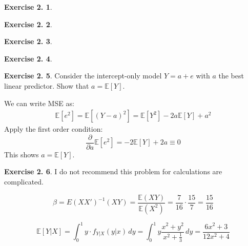 \documentclass[12pt,letterpaper,reqno]{amsart}
\newcommand{\E}{\mathbb E}
\theoremstyle{plain}
\theoremstyle{definition}
\theoremstyle{definition}
\newtheorem{Exercise}{Exercise 2.}
\numberwithin{equation}{section}
\begin{document}
\begin{Exercise}
\end{Exercise}

\begin{Exercise}
\end{Exercise}

\begin{Exercise}
\end{Exercise}

\begin{Exercise}
\end{Exercise}


\begin{Exercise} Consider the intercept-only model $Y = a + e$ with $a$ the best linear predictor. Show that
$a = \E[Y]$. 

We can write MSE as:
\[\begin{split}
    \E[e^2] =  \E[(Y-a)^2] = \E[Y^2]-2a\E[Y]+a^2
\end{split}\]
Apply the first order condition:
\[
    \frac{\partial}{\partial a} \E[e^2] = -2\E[Y]+2a \equiv 0
\]
This shows $a = \E[Y]$. 
\end{Exercise}

\begin{Exercise}

I do not recommend this problem for calculations are complicated. 


\[
    \beta=E(XX')^{-1}(XY)=\frac{\E(XY)}{\E(X^2)}=\frac{7}{16} \cdot \frac{15}{7} = \frac{15}{16} 
\]

\[
    \E[Y|X]= \int_{0}^{1} y \cdot f_{Y|X}(y|x) \,dy = \int_{0}^{1} y \frac{x^2+y^2}{x^2+\frac{1}{3}} \,dy = \frac{6x^2+3}{12x^2+4}
\]

\end{Exercise}
\end{document}
